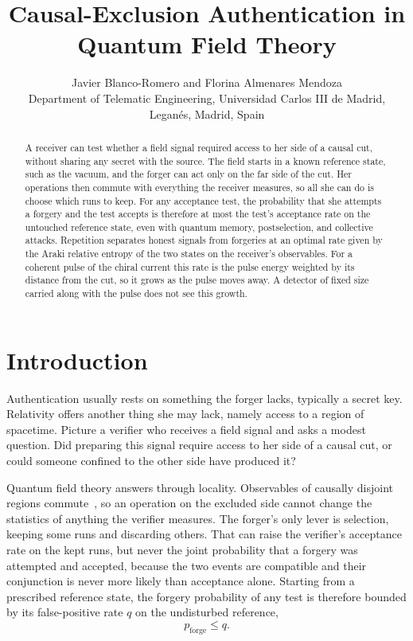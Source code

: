 \documentclass[11pt,a4paper]{article}
\title{Causal-Exclusion Authentication in Quantum Field Theory}
\author{Javier Blanco-Romero and Florina Almenares Mendoza\\\small Department of Telematic Engineering, Universidad Carlos III de Madrid,\\Legan\'es, Madrid, Spain}
\date{}
\begin{document}
\maketitle
\begin{abstract}
A receiver can test whether a field signal required access to her side of a causal cut, without sharing any secret with the source. The field starts in a known reference state, such as the vacuum, and the forger can act only on the far side of the cut. Her operations then commute with everything the receiver measures, so all she can do is choose which runs to keep. For any acceptance test, the probability that she attempts a forgery and the test accepts is therefore at most the test's acceptance rate on the untouched reference state, even with quantum memory, postselection, and collective attacks. Repetition separates honest signals from forgeries at an optimal rate given by the Araki relative entropy of the two states on the receiver's observables. For a coherent pulse of the chiral current this rate is the pulse energy weighted by its distance from the cut, so it grows as the pulse moves away. A detector of fixed size carried along with the pulse does not see this growth.
\end{abstract}

\section{Introduction}
\label{sec:intro}

Authentication usually rests on something the forger lacks, typically a secret key. Relativity offers another thing she may lack, namely access to a region of spacetime. Picture a verifier who receives a field signal and asks a modest question. Did preparing this signal require access to her side of a causal cut, or could someone confined to the other side have produced it?

Quantum field theory answers through locality. Observables of causally disjoint regions commute~\cite{haag1964algebraic}, so an operation on the excluded side cannot change the statistics of anything the verifier measures. The forger's only lever is selection, keeping some runs and discarding others. That can raise the verifier's acceptance rate on the kept runs, but never the joint probability that a forgery was attempted and accepted, because the two events are compatible and their conjunction is never more likely than acceptance alone. Starting from a prescribed reference state, the forgery probability of any test is therefore bounded by its false-positive rate $q$ on the undisturbed reference,
\begin{equation*}
 p_{\mathrm{forge}}\le q .
\end{equation*}
\end{document}
